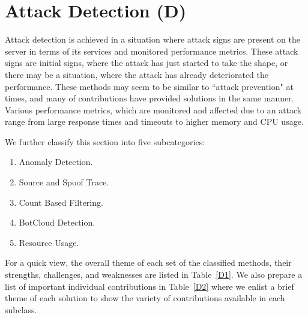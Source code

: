 \documentclass[final,5p,times,twocolumn]{elsarticle}
\begin{document}
\section{Attack Detection (D)}
\label{detection} 
Attack detection is achieved in a situation where attack signs are present on the server in terms of its services and monitored performance metrics. These attack signs are initial signs, where the attack has just started to take the shape, or there may be a situation, where the attack has already deteriorated the performance. These methods may seem to be similar to ``attack prevention" at times, and many of contributions have provided solutions in the same manner. Various performance metrics, which are monitored and affected due to an attack range from large response times and timeouts to higher memory and CPU usage. {We further classify this section into five subcategories:
\begin{enumerate}[1.]
\item Anomaly Detection.
\item Source and Spoof Trace.
\item Count Based Filtering.
\item BotCloud Detection.
\item Resource Usage.
\end{enumerate} 
For a quick view, the overall theme of each set of the classified methods, their strengths, challenges, and weaknesses are listed in Table~\ref{D1}. We also prepare a list of important individual contributions in Table~\ref{D2} where we enlist a brief theme of each solution to show the variety of contributions available in each subclass.}
\end{document}
